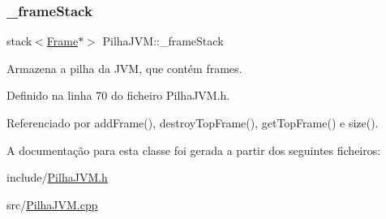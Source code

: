 \subsubsection{\texorpdfstring{\+\_\+frame\+Stack}{\_frameStack}}
{\footnotesize\ttfamily stack$<$\hyperlink{classFrame}{Frame}$\ast$$>$ Pilha\+J\+V\+M\+::\+\_\+frame\+Stack\hspace{0.3cm}{\ttfamily [private]}}

Armazena a pilha da J\+VM, que contém frames. 

Definido na linha 70 do ficheiro Pilha\+J\+V\+M.\+h.



Referenciado por add\+Frame(), destroy\+Top\+Frame(), get\+Top\+Frame() e size().



A documentação para esta classe foi gerada a partir dos seguintes ficheiros\+:\begin{DoxyCompactItemize}
\item 
include/\hyperlink{PilhaJVM_8h}{Pilha\+J\+V\+M.\+h}\item 
src/\hyperlink{PilhaJVM_8cpp}{Pilha\+J\+V\+M.\+cpp}\end{DoxyCompactItemize}
